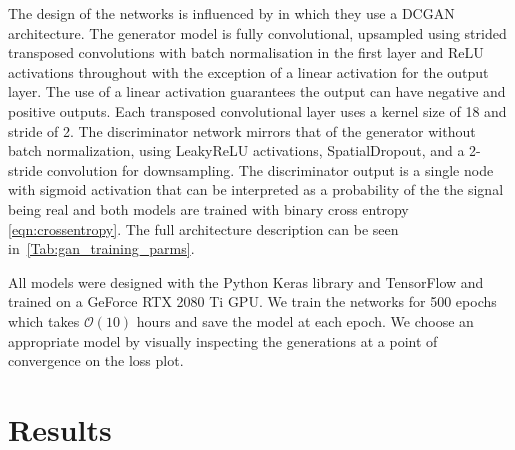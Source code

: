\documentclass[12pt]{iopart}
\begin{document}
The design of the networks is influenced by \cite{Radford2015} in which they use a \ac{DCGAN} architecture. The generator model is fully convolutional, upsampled using strided transposed convolutions with batch normalisation in the first layer and ReLU activations throughout with the exception of a linear activation for the output layer. The use of a linear activation guarantees the output can have negative and positive outputs. Each transposed convolutional layer uses a kernel size of 18 and stride of 2. The discriminator network mirrors that of the generator without batch normalization, using LeakyReLU activations, SpatialDropout, and a 2-stride convolution for downsampling. The discriminator output is a single node with sigmoid activation that can be interpreted as a probability of the the signal being real and both models are trained with binary cross entropy \cref{eqn:crossentropy}. The full architecture description can be seen in~\cref{Tab:gan_training_parms}.

All models were designed with the Python Keras library \cite{chollet2015keras} and TensorFlow \cite{tensorflow2015-whitepaper} and trained on a GeForce RTX 2080 Ti GPU. We train the networks for 500 epochs which takes $\mathcal{O}(10)$ hours and save the model at each epoch. We choose an appropriate model by visually inspecting the generations at a point of convergence on the loss plot. 
\section{Results} \label{results}

\end{document}
